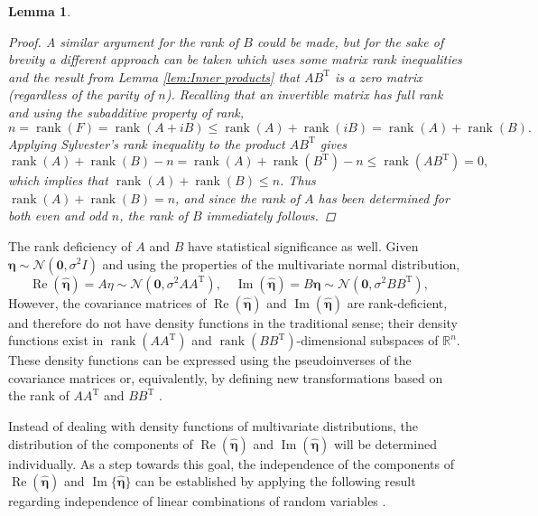 \documentclass[12pt,notitlepage]{report}
\newcommand{\trans}{\mathrm{T}}	%
\DeclareMathOperator{\rank}{rank}	%
\newcommand{\noise}{\eta}	%
\newcommand{\noiseSD}{\sigma}	%
\newcommand{\noiseVec}{\bm{\noise}}	%
\renewcommand{\Re}{\operatorname{Re}}	%
\renewcommand{\Im}{\operatorname{Im}}	%
\newtheorem{lemma}{Lemma}[section]
\begin{document}
\begin{lemma}
\begin{proof}
A similar argument for the rank of $B$ could be made, but for the sake of brevity a different approach can be taken which uses some matrix rank inequalities and  the result from Lemma \ref{lem:Inner products} that $AB^\trans$ is a zero matrix (regardless of the parity of $n$). Recalling that an invertible matrix has full rank and using the subadditive property of rank,
\[n = \rank(F) = \rank(A + iB) \leq \rank(A) + \rank(iB) = \rank(A) + \rank(B).\] 
Applying Sylvester's rank inequality to the product $AB^\trans$ gives
\[\rank(A) + \rank(B) - n = \rank(A) + \rank(B^\trans) - n \leq \rank(AB^\trans) = 0,\]
which implies that $\rank(A) + \rank(B) \leq n$. Thus $\rank(A) + \rank(B) = n$, and since the rank of $A$ has been determined for both even and odd $n$, the rank of $B$ immediately follows. 
\end{proof}
\end{lemma} 

The rank deficiency of $A$ and $B$ have statistical significance as well.  Given $\noiseVec \sim \mathcal{N}(\bm{0},\noiseSD^2I)$ and using the properties of the multivariate normal distribution, 
\begin{equation}
\Re(\widehat{\noiseVec}) = A\noise \sim \mathcal{N}(\bm{0},\noiseSD^2 AA^\trans), \quad \Im(\widehat{\noiseVec}) = B\noiseVec \sim \mathcal{N}(\bm{0},\noiseSD^2 BB^\trans), \quad
\label{eq:Real and imaginary distributions}
\end{equation}
However, the covariance matrices of $\Re(\widehat{\noiseVec})$ and $\Im(\widehat{\noiseVec})$ are rank-deficient, and therefore do not have density functions in the traditional sense; their density functions exist in $\rank(AA^\trans)$ and $\rank(BB^\trans)$-dimensional subspaces of $\mathbb{R}^n$. These density functions can be expressed using the pseudoinverses of the covariance matrices or, equivalently, by defining new transformations based on the rank of $AA^\trans$ and $BB^\trans$ \cite[p.~527-528]{Rao1973}. \par 
Instead of dealing with density functions of multivariate distributions, the distribution of the components of $\Re(\widehat{\noiseVec})$ and $\Im(\widehat{\noiseVec})$ will be determined individually. As a step towards this goal, the independence of the components of $\Re(\widehat{\noiseVec})$ and $\Im\{\widehat{\noiseVec}\}$ can be established by applying the following result regarding independence of linear combinations of random variables \cite{LukacsKing}.
\end{document}
